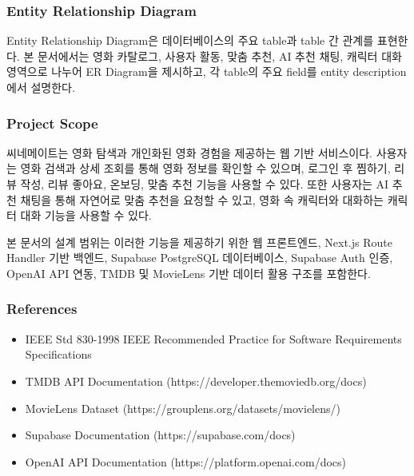 \documentclass[11pt,a4paper]{article}
\providecommand{\tightlist}{%
  \setlength{\itemsep}{0.25em}\setlength{\parskip}{0.1em}}
\begin{document}
\hypertarget{entity-relationship-diagram}{%
\subsubsection{Entity Relationship Diagram}\label{entity-relationship-diagram}}

Entity Relationship Diagram은 데이터베이스의 주요 table과 table 간 관계를 표현한다. 본 문서에서는 영화 카탈로그, 사용자 활동, 맞춤 추천, AI 추천 채팅, 캐릭터 대화 영역으로 나누어 ER Diagram을 제시하고, 각 table의 주요 field를 entity description에서 설명한다.

\hypertarget{project-scope}{%
\subsubsection{Project Scope}\label{project-scope}}

씨네메이트는 영화 탐색과 개인화된 영화 경험을 제공하는 웹 기반 서비스이다. 사용자는 영화 검색과 상세 조회를 통해 영화 정보를 확인할 수 있으며, 로그인 후 찜하기, 리뷰 작성, 리뷰 좋아요, 온보딩, 맞춤 추천 기능을 사용할 수 있다. 또한 사용자는 AI 추천 채팅을 통해 자연어로 맞춤 추천을 요청할 수 있고, 영화 속 캐릭터와 대화하는 캐릭터 대화 기능을 사용할 수 있다.

본 문서의 설계 범위는 이러한 기능을 제공하기 위한 웹 프론트엔드, Next.js Route Handler 기반 백엔드, Supabase PostgreSQL 데이터베이스, Supabase Auth 인증, OpenAI API 연동, TMDB 및 MovieLens 기반 데이터 활용 구조를 포함한다.

\hypertarget{references}{%
\subsubsection{References}\label{references}}

\begin{itemize}
\tightlist
\item
  IEEE Std 830-1998 IEEE Recommended Practice for Software Requirements Specifications
\item
  TMDB API Documentation (https://developer.themoviedb.org/docs)
\item
  MovieLens Dataset (https://grouplens.org/datasets/movielens/)
\item
  Supabase Documentation (https://supabase.com/docs)
\item
  OpenAI API Documentation (https://platform.openai.com/docs)
\end{itemize}

\clearpage
\end{document}
